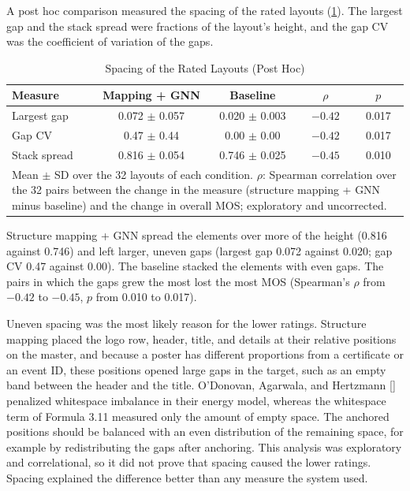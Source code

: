 \begin{refsection}
\clearpage
A post hoc comparison measured the spacing of the rated layouts (\ref{tab:spacing}). The largest gap and the stack spread were fractions of the layout's height, and the gap CV was the coefficient of variation of the gaps.

\begin{table}[!ht]
\centering
\caption{Spacing of the Rated Layouts (Post Hoc)}
\label{tab:spacing}
\begin{tabular}{l c c c c}
\hline
\textbf{Measure} & \textbf{Mapping + GNN} & \textbf{Baseline} & \textbf{$\rho$} & \textbf{$p$} \\ \hline
Largest gap & 0.072 $\pm$ 0.057 & 0.020 $\pm$ 0.003 & $-0.42$ & 0.017 \\
Gap CV & 0.47 $\pm$ 0.44 & 0.00 $\pm$ 0.00 & $-0.42$ & 0.017 \\
Stack spread & 0.816 $\pm$ 0.054 & 0.746 $\pm$ 0.025 & $-0.45$ & 0.010 \\ \hline
\multicolumn{5}{p{0.80\textwidth}}{\footnotesize Mean $\pm$ SD over the 32 layouts of each condition. $\rho$: Spearman correlation over the 32 pairs between the change in the measure (structure mapping + GNN minus baseline) and the change in overall MOS; exploratory and uncorrected.}
\end{tabular}
\end{table}

Structure mapping + GNN spread the elements over more of the height (0.816 against 0.746) and left larger, uneven gaps (largest gap 0.072 against 0.020; gap CV 0.47 against 0.00). The baseline stacked the elements with even gaps. The pairs in which the gaps grew the most lost the most MOS (Spearman's $\rho$ from $-0.42$ to $-0.45$, $p$ from 0.010 to 0.017).

Uneven spacing was the most likely reason for the lower ratings. Structure mapping placed the logo row, header, title, and details at their relative positions on the master, and because a poster has different proportions from a certificate or an event ID, these positions opened large gaps in the target, such as an empty band between the header and the title. O'Donovan, Agarwala, and Hertzmann [\citeyear{ODonovan2014Layouts}] penalized whitespace imbalance in their energy model, whereas the whitespace term of Formula 3.11 measured only the amount of empty space. The anchored positions should be balanced with an even distribution of the remaining space, for example by redistributing the gaps after anchoring. This analysis was exploratory and correlational, so it did not prove that spacing caused the lower ratings. Spacing explained the difference better than any measure the system used.


\end{refsection}

